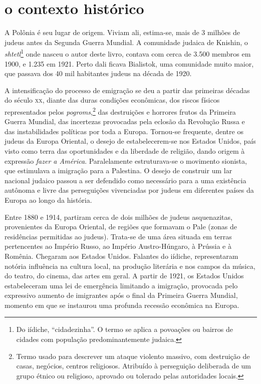 \section{o contexto histórico}

A Polônia é seu lugar de origem. Viviam ali, estima-se, mais de
3 milhões de judeus antes da Segunda Guerra Mundial. A comunidade
judaica de Knishin, o \textit{shtetl}\footnote{Do iídiche, ``cidadezinha''. O termo se aplica a povoações ou bairros de cidades com população predominantemente judaica.} onde nasceu o autor deste livro, contava com cerca de 3.500 membros em 1900, e 1.235 em 1921. Perto dali ficava Bialistok, uma comunidade muito maior, que passava dos 40 mil habitantes judeus na
década de 1920. 

A intensificação do processo de emigração se deu a partir das primeiras décadas do século \textsc{xx}, diante das duras condições econômicas, dos riscos físicos representados pelos
\textit{pogroms},\footnote{Termo usado para descrever um ataque violento massivo, com destruição de casas, negócios, centros religiosos. Atribuído à perseguição deliberada de um grupo étnico ou religioso, aprovado ou tolerado pelas autoridades locais.} das destruições e horrores frutos da Primeira Guerra Mundial,
das incertezas provocadas pela eclosão da Revolução Russa e das
instabilidades políticas por toda a Europa. Tornou-se frequente, dentre os
judeus da Europa Oriental, o desejo de estabelecerem-se nos Estados
Unidos, país visto como terra das oportunidades e da liberdade de
religião, dando origem à expressão \textit{fazer a América}. Paralelamente estruturava-se o movimento sionista, que estimulava a imigração para a Palestina. O desejo de construir um lar nacional judaico passou a ser defendido como necessário para a uma existência autônoma e livre das perseguições vivenciadas por judeus em diferentes países da Europa ao longo da história. 

Entre 1880 e 1914, partiram cerca de dois milhões de judeus
asquenazitas, provenientes da Europa Oriental, de regiões que formavam o
Pale (zonas de residências permitidas ao judeus). Trata-se de uma área
situada em terras pertencentes ao Império Russo, ao Império
Austro-Húngaro, à Prússia e à Romênia. Chegaram aos Estados Unidos.
Falantes do iídiche, representaram notória influência na cultura local,
na produção literária e nos campos da música, do teatro, do cinema, das
artes em geral. A partir de 1921, os Estados Unidos estabeleceram uma
lei de emergência limitando a imigração, provocada pelo expressivo
aumento de imigrantes após o final da Primeira Guerra Mundial, momento
em que se instaurou uma profunda recessão econômica na Europa.

